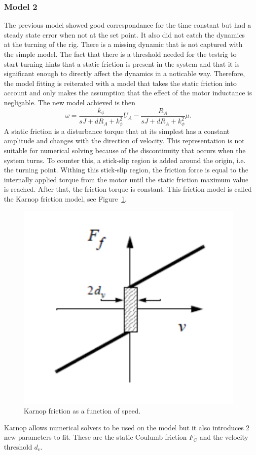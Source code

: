 \subsubsection{Model 2}
The previous model showed good correspondance for the time constant but had a
steady state error when not at the set point. It also did not catch the dynamics
at the turning of the rig. There is a missing dynamic that is not captured with
the simple model. The fact that there is a threshold needed for the testrig to
start turning hints that a static friction is present in the system and that it
is significant enough to directly affect the dynamics in a noticable way.
Therefore, the model fitting is reiterated with a model that takes the static
friction into account and only makes the assumption that the effect of the motor
inductance is negligable. The new model achieved is then
\begin{equation} \label{eq:model2}
    \omega = \frac {k_{\phi}} {sJ + d R_A + k_{\phi}^2} U_A -
    \frac {R_A} {sJ + d R_A + k_{\phi}^2} \mu.
\end{equation}
A static friction is a disturbance torque that at its simplest has a constant
amplitude and changes with the direction of velocity. This representation is not
suitable for numerical solving because of the discontinuity that occurs when the
system turns. To counter this, a stick-slip region is added around the origin,
i.e. the turning point. Withing this stick-slip region, the friction force is
equal to the internally applied torque from the motor until the static friction
maximum value is reached. After that, the friction torque is constant. This
friction model is called the Karnop friction model, see Figure~\ref{fig:karnop}.
\begin{figure}[H]
    \label{fig:karnop}
    \centering
    \includegraphics[width=\textwidth]{./img/testrig_karnop.png}
    \caption{Karnop friction as a function of speed.}
\end{figure}
Karnop allows numerical solvers to be used on the model but it also introduces 2 new
parameters to fit. These are the static Coulumb friction $F_C$ and the velocity
threshold $d_v$.

